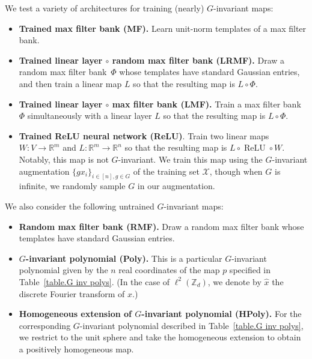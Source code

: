 \documentclass{article}
\theoremstyle{plain}
\theoremstyle{definition}
\begin{document}
We test a variety of architectures for training (nearly) $G$-invariant maps:
\begin{itemize}
\item
\textbf{Trained max filter bank (MF).}
Learn unit-norm templates of a max filter bank.
\item
\textbf{Trained linear layer $\circ$ random max filter bank (LRMF).}
Draw a random max filter bank~$\Phi$ whose templates have standard Gaussian entries, and then train a linear map $L$ so that the resulting map is $L \circ \Phi$.
\item
\textbf{Trained linear layer $\circ$ max filter bank (LMF).}
Train a max filter bank $\Phi$ simultaneously with a linear layer $L$ so that the resulting map is $L \circ \Phi$.
\item
\textbf{Trained ReLU neural network (ReLU)}.
Train two linear maps $W\colon V\to\mathbb{R}^m$ and $L\colon\mathbb{R}^m\to\mathbb{R}^n$ so that the resulting map is $L\circ\operatorname{ReLU}\circ W$.
Notably, this map is not $G$-invariant.
We train this map using the $G$-invariant augmentation $\{gx_i\}_{i\in[n],g\in G}$ of the training set $\mathcal{X}$, though when $G$ is infinite, we randomly sample $G$ in our augmentation.
\end{itemize}
We also consider the following untrained $G$-invariant maps:
\begin{itemize}
\item
\textbf{Random max filter bank (RMF).}
Draw a random max filter bank whose templates have standard Gaussian entries.
\item
\textbf{$G$-invariant polynomial (Poly).}
This is a particular $G$-invariant polynomial given by the $n$ real coordinates of the map $p$ specified in Table~\ref{table.G inv polys}.
(In the case of $\ell^2(\mathbb{Z}_d)$, we denote by $\hat{x}$ the discrete Fourier transform of $x$.)
\item
\textbf{Homogeneous extension of $G$-invariant polynomial (HPoly).}
For the corresponding $G$-invariant polynomial described in Table~\ref{table.G inv polys}, we restrict to the unit sphere and take the homogeneous extension to obtain a positively homogeneous map.
\end{itemize}
\end{document}

